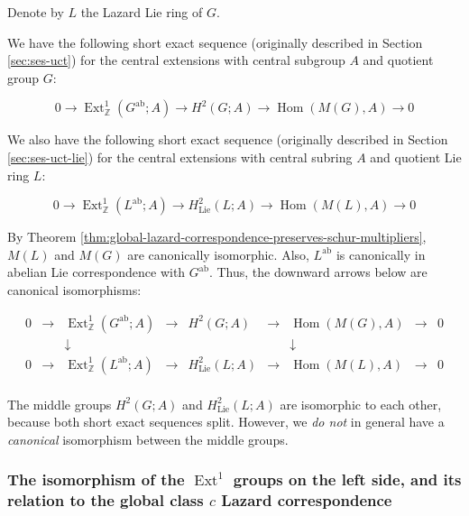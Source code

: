 Denote by $L$ the Lazard Lie ring of $G$.

We have the following short exact sequence (originally described in
Section \ref{sec:ses-uct}) for the central extensions with central
subgroup $A$ and quotient group $G$:

\begin{equation*}
  0 \to \operatorname{Ext}^1_{\mathbb{Z}}(G^{\operatorname{ab}};A) \to H^2(G;A) \to \operatorname{Hom}(M(G),A) \to 0
\end{equation*}

We also have the following short exact sequence (originally described
in Section \ref{sec:ses-uct-lie}) for the central extensions with
central subring $A$ and quotient Lie ring $L$:

\begin{equation*}
0 \to \operatorname{Ext}^1_{\mathbb{Z}}(L^{\operatorname{ab}};A) \to H^2_{\text{Lie}}(L;A) \to \operatorname{Hom}(M(L), A) \to 0
\end{equation*}

By Theorem
\ref{thm:global-lazard-correspondence-preserves-schur-multipliers},
$M(L)$ and $M(G)$ are canonically isomorphic. Also,
$L^{\operatorname{ab}}$ is canonically in abelian Lie correspondence
with $G^{\operatorname{ab}}$. Thus, the downward arrows below are
canonical isomorphisms:

$$\begin{array}{ccccccccc}
  0 &\to &\operatorname{Ext}^1_{\mathbb{Z}}(G^{\operatorname{ab}};A) &\to &H^2(G;A) &\to &\operatorname{Hom}(M(G),A) &\to &0\\
  & & \downarrow & & & & \downarrow & & \\
  0 &\to &\operatorname{Ext}^1_{\mathbb{Z}}(L^{\operatorname{ab}};A) & \to & H^2_{\text{Lie}}(L;A) & \to & \operatorname{Hom}(M(L), A) & \to & 0\\
\end{array}$$
  
The middle groups $H^2(G;A)$ and $H^2_{\text{Lie}}(L;A)$ are isomorphic
to each other, because both short exact sequences split. However, we
{\em do not} in general have a {\em canonical} isomorphism between the
middle groups.

\subsubsection{The isomorphism of the $\operatorname{Ext}^1$ groups on the left side, and its relation to the global class $c$ Lazard correspondence}

